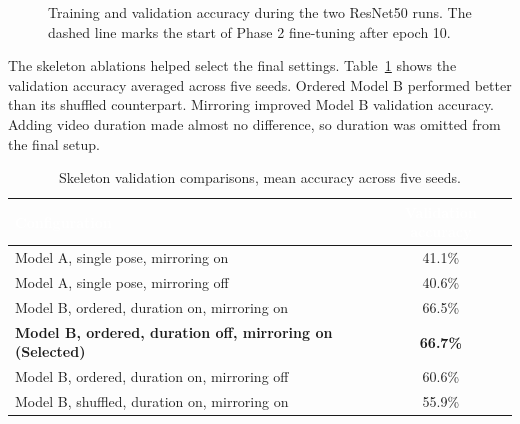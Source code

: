 \documentclass[12pt,a4paper]{article}
\begin{document}
\begin{figure}[H]
\begin{minipage}{0.475\textwidth}
\end{minipage}
\caption{Training and validation accuracy during the two ResNet50 runs. The dashed line marks the start of Phase 2 fine-tuning after epoch 10.}
\label{fig:resnet-curves}
\end{figure}

The skeleton ablations helped select the final settings. Table~\ref{tab:ablation} shows the validation accuracy averaged across five seeds. Ordered Model B performed better than its shuffled counterpart. Mirroring improved Model B validation accuracy. Adding video duration made almost no difference, so duration was omitted from the final setup.

\vspace{0.6em}
\begin{table}[H]
\centering
\small
\setlength{\tabcolsep}{10pt}
\renewcommand{\arraystretch}{1.20}
\caption{Skeleton validation comparisons, mean accuracy across five seeds.}
\label{tab:ablation}
\begin{tabular}{lc}
\toprule
\rowcolor{tablehead}
\textcolor{white}{\textbf{Configuration}} & \textcolor{white}{\textbf{Validation accuracy}} \\
\midrule
\rowcolor{tablerowlight}
Model A, single pose, mirroring on & 41.1\% \\
Model A, single pose, mirroring off & 40.6\% \\
\rowcolor{tablerowlight}
Model B, ordered, duration on, mirroring on & 66.5\% \\
\rowcolor{tablehighlight}
\textbf{Model B, ordered, duration off, mirroring on (Selected)} & \textbf{66.7\%} \\
\rowcolor{tablerowlight}
Model B, ordered, duration on, mirroring off & 60.6\% \\
Model B, shuffled, duration on, mirroring on & 55.9\% \\
\bottomrule
\end{tabular}
\end{table}
\end{document}
